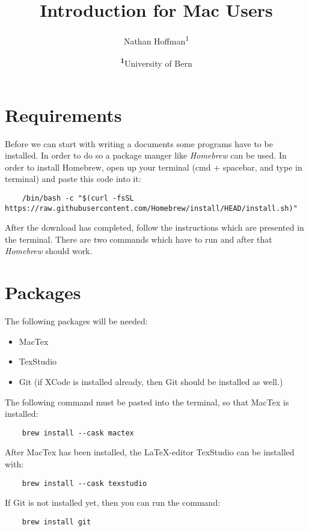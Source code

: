 \documentclass[
	a4paper, %
	10pt, %
	unnumberedsections, %
	twoside, %
	onecolumn,
]{LTJournalArticle}
\title{Introduction for Mac Users} %
\author{%
	Nathan Hoffman\textsuperscript{1}
}
\date{\footnotesize\textsuperscript{\textbf{1}}University of Bern}
\begin{document}
\maketitle %


\section{Requirements}
Before we can start with writing a documents some programs have to be installed. In order to do so a package manger like \emph{Homebrew} can be used. 
In order to install Homebrew, open up your terminal (cmd + spacebar, and type in terminal) and paste this code into it:
\begin{verbatim}
	/bin/bash -c "$(curl -fsSL https://raw.githubusercontent.com/Homebrew/install/HEAD/install.sh)"
\end{verbatim}

After the download has completed, follow the instructions which are presented in the terminal. There are two commands which have to run and after that \emph{Homebrew} should work.

\section{Packages}
The following packages will be needed:
\begin{itemize}
	\item MacTex
	\item TexStudio
	\item Git (if XCode is installed already, then Git should be installed as well.)
\end{itemize}

The following command must be pasted into the terminal, so that MacTex is installed:
\begin{verbatim}
	brew install --cask mactex
\end{verbatim}

After MacTex has been installed, the \LaTeX-editor TexStudio can be installed with:
\begin{verbatim}
	brew install --cask texstudio
\end{verbatim}

If Git is not installed yet, then you can run the command:
\begin{verbatim}
	brew install git
\end{verbatim}
\end{document}
